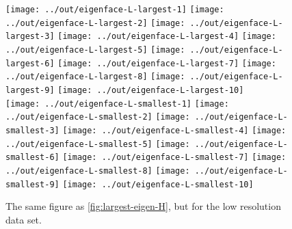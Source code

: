 \documentclass[headings=optiontoheadandtoc,listof=totoc,parskip=full]{scrartcl}
\begin{document}
\begin{figure}[H]
	\centering
	\texttt{[image: ../out/eigenface-L-largest-1]}
	\texttt{[image: ../out/eigenface-L-largest-2]}
	\texttt{[image: ../out/eigenface-L-largest-3]}
	\texttt{[image: ../out/eigenface-L-largest-4]}
	\texttt{[image: ../out/eigenface-L-largest-5]}
	\texttt{[image: ../out/eigenface-L-largest-6]}
	\texttt{[image: ../out/eigenface-L-largest-7]}
	\texttt{[image: ../out/eigenface-L-largest-8]}
	\texttt{[image: ../out/eigenface-L-largest-9]}
	\texttt{[image: ../out/eigenface-L-largest-10]}\\
	\texttt{[image: ../out/eigenface-L-smallest-1]}
	\texttt{[image: ../out/eigenface-L-smallest-2]}
	\texttt{[image: ../out/eigenface-L-smallest-3]}
	\texttt{[image: ../out/eigenface-L-smallest-4]}
	\texttt{[image: ../out/eigenface-L-smallest-5]}
	\texttt{[image: ../out/eigenface-L-smallest-6]}
	\texttt{[image: ../out/eigenface-L-smallest-7]}
	\texttt{[image: ../out/eigenface-L-smallest-8]}
	\texttt{[image: ../out/eigenface-L-smallest-9]}
	\texttt{[image: ../out/eigenface-L-smallest-10]}
	\caption{The same figure as \cref{fig:largest-eigen-H}, but for the low resolution data set.}
	\label{fig:largest-eigen-L}
\end{figure}
\end{document}
